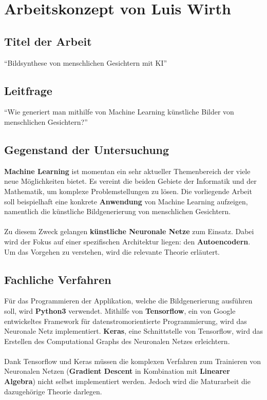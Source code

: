 \documentclass[12pt, a4paper]{article}
\begin{document}
\sloppy

\section*{Arbeitskonzept von Luis Wirth}

\subsection*{Titel der Arbeit}
``Bildsynthese von menschlichen Gesichtern mit KI''

\subsection*{Leitfrage}
``Wie generiert man mithilfe von Machine Learning künstliche Bilder von menschlichen Gesichtern?''

\subsection*{Gegenstand der Untersuchung}
\textbf{Machine Learning} ist momentan ein sehr aktueller Themenbereich der viele neue Möglichkeiten bietet.
Es vereint die beiden Gebiete der Informatik und der Mathematik, um komplexe Problemstellungen zu lösen.
Die vorliegende Arbeit soll beispielhaft eine konkrete \textbf{Anwendung} von Machine Learning aufzeigen, namentlich die künstliche Bildgenerierung von menschlichen Gesichtern.
\\\\
Zu diesem Zweck gelangen \textbf{künstliche Neuronale Netze} zum Einsatz. Dabei wird der Fokus auf einer spezifischen Architektur liegen: den \textbf{Autoencodern}.
Um das Vorgehen zu verstehen, wird die relevante Theorie erläutert.

\subsection*{Fachliche Verfahren}
Für das Programmieren der Applikation, welche die Bildgenerierung ausführen soll, wird \textbf{Python3} verwendet.
Mithilfe von \textbf{Tensorflow}, ein von Google entwickeltes Framework für datenstromorientierte Programmierung, wird das Neuronale Netz implementiert.
\textbf{Keras}, eine Schnittstelle von Tensorflow, wird das Erstellen des Computational Graphs des Neuronalen Netzes erleichtern. 
\\\\
Dank Tensorflow und Keras müssen die komplexen Verfahren zum Trainieren von Neuronalen Netzen (\textbf{Gradient Descent} in Kombination mit  \textbf{Linearer Algebra}) nicht selbst implementiert werden.
Jedoch wird die Maturarbeit die dazugehörige Theorie darlegen.
\end{document}

